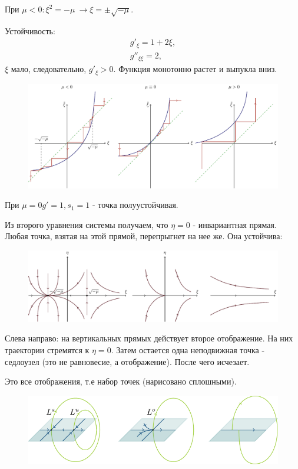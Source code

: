 При $\mu<0: \xi^2=-\mu~\rightarrow \xi=\pm \sqrt{-\mu}$.

Устойчивость:
\begin{gather*}
	g'_{\xi}=1+2\xi, \\
	g''_{\xi \xi}=2,
\end{gather*}
$\xi$ мало, следовательно, $g'_{\xi}>0$. Функция монотонно растет и выпукла вниз.
\begin{figure}[H]
	\centering
	\includegraphics[width=1\linewidth]{fig/fig64.pdf}   
\end{figure}

При $\mu=0 g'=1, s_1=1$ - точка полуустойчивая. 

Из второго уравнения системы получаем, что $\eta=0$ - инвариантная прямая. Любая точка, взятая на этой прямой, перепрыгнет на нее же. Она устойчива:  
\begin{figure}[H]
	\centering
	\includegraphics[width=1\linewidth]{fig/fig65.pdf}   
\end{figure}

Слева направо: на вертикальных прямых действует второе отображение. На них траектории стремятся к $\eta=0$. Затем остается одна неподвижная точка - седлоузел (это не равновесие, а отображение). После чего исчезает.

Это все отображения, т.е набор точек (нарисовано сплошными).
\begin{figure}[H]
	\centering
	\includegraphics[width=1\linewidth]{fig/fig66.pdf}   
\end{figure}

